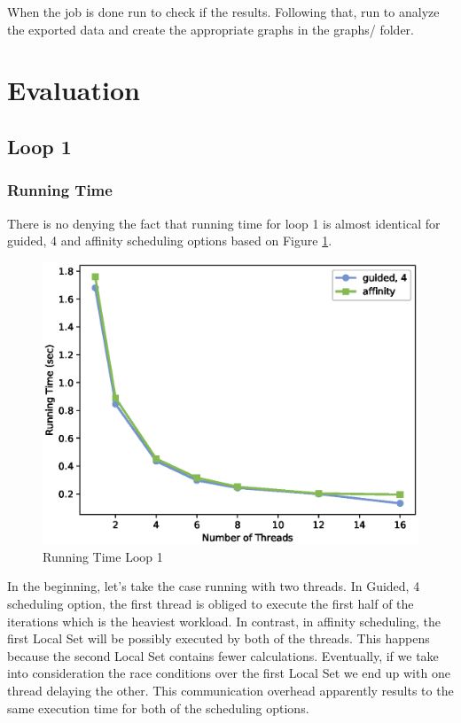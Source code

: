 \documentclass[12pt,a4paper]{article}
\begin{document}
When the job is done run  to check if the results. Following that, run  to analyze the exported data and create the appropriate graphs in the graphs/ folder.

\section{Evaluation}

\subsection{Loop 1}

\subsubsection{Running Time}

There is no denying the fact that running time for loop 1 is almost identical for guided, 4 and affinity scheduling options based on Figure \ref{runningTimeLoop1}.

\begin{figure}[h!]
	\centering
	\includegraphics[scale=0.6]{../graphs/loop1_running_time.eps}
	\caption{Running Time Loop 1}
	\label{runningTimeLoop1}
\end{figure}

In the beginning, let's take the case running with two threads. In Guided, 4 scheduling option, the first thread is obliged to execute the first half of the iterations which is the heaviest workload. In contrast, in affinity scheduling, the first Local Set will be possibly executed by both of the threads. This happens because the second Local Set contains fewer calculations. Eventually, if we take into consideration the race conditions over the first Local Set we end up with one thread delaying the other. This communication overhead apparently results to the same execution time for both of the scheduling options.
\end{document}
